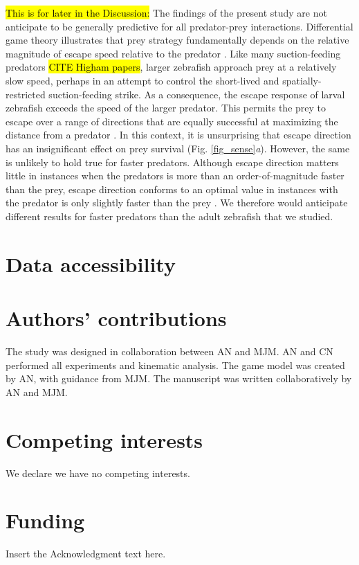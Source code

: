 \documentclass[]{rsos}%
\begin{document}
\hl{This is for later in the Discussion:} The findings of the present study are not anticipate to be generally predictive for all predator-prey interactions. 
Differential game theory illustrates that prey strategy fundamentally depends on the relative magnitude of escape speed relative to the predator \cite{Weihs:1984tb}.
Like many suction-feeding predators \hl{CITE Higham papers}, larger zebrafish approach prey at a relatively slow speed, perhaps in an attempt to control the short-lived and spatially-restricted suction-feeding strike. 
As a consequence, the escape response of larval zebrafish exceeds the speed of the larger predator. 
This permits the prey to escape over a range of directions that are equally successful at maximizing the distance from a predator \cite{Soto:2015cj}.
In this context, it is unsurprising that escape direction has an insignificant effect on prey survival (Fig. \ref{fig_sense}\textit{a}).
However, the same is unlikely to hold true for faster predators.  
Although escape direction matters little in instances when the predators is more than an order-of-magnitude faster than the prey, escape direction conforms to an optimal value in instances with the predator is only slightly faster than the prey \cite{Weihs:1984tb}.
We therefore would anticipate different results for faster predators than the adult zebrafish that we studied.



\section*{Data accessibility}


\section*{Authors' contributions}
The study was designed in collaboration between AN and MJM.
AN and CN performed all experiments and kinematic analysis.
The game model was created by AN, with guidance from MJM. 
The manuscript was written collaboratively by AN and MJM.

\section*{Competing interests}
We declare we have no competing interests.

\section*{Funding}
Insert the Acknowledgment text here.
\end{document}
